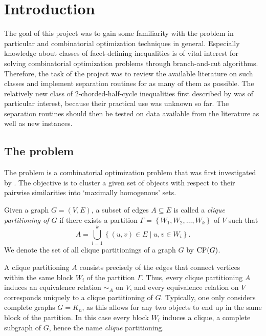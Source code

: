 \section{Introduction}
The goal of this project was to gain some familiarity with the \CP problem in particular and combinatorial optimization techniques in general.
Especially knowledge about classes of facet-defining inequalities is of vital interest for solving combinatorial optimization problems through branch-and-cut algorithms.
Therefore, the task of the project was to review the available literature on such classes and implement separation routines for as many of them as possible.
The relatively new class of $2$-chorded-half-cycle inequalities first described by \cite{andresPolyhedralStudyLifted2022} was of particular interest, because their practical use was unknown so far.
The separation routines should then be tested on data available from the literature as well as new instances.

\subsection{The \CP problem}\label{subsec:cp}
The \CP problem is a combinatorial optimization problem that was first investigated by \cite{grotschelFacetsCliquePartitioning1990}.
The objective is to cluster a given set of objects with respect to their pairwise similarities into ‘maximally homogenous’ sets.

\begin{definition}[\CP]\label{def:cp}
	Given a graph $G=(V,E)$, a subset of edges $A \subseteq E$ is called a \textit{clique partitioning of $G$} if there exists a partition $\Gamma = \left\{ W_1, W_2, \ldots, W_k \right\}$ of $V$ such that
	\[
		A = \bigcup_{i=1}^k \left\{ (u,v) \in E \mid u,v \in W_i \right\}.
	\]
We denote the set of all clique partitionings of a graph $G$ by $\operatorname{\text{CP}}(G)$.
\end{definition}
\begin{note}
A clique partitioning $A$ consists precisely of the edges that connect vertices within the same block $W_i$ of the partition $\Gamma$.
Thus, every clique partitioning $A$ induces an equivalence relation $\sim_A$ on $V$, and every equivalence relation on $V$ corresponds uniquely to a clique partitioning of $G$.
Typically, one only considers complete graphs $G = K_n$, as this allows for any two objects to end up in the same block of the partition.
In this case every block $W_i$ induces a clique, \ie a complete subgraph of $G$, hence the name \textit{clique} partitioning.
\end{note}

